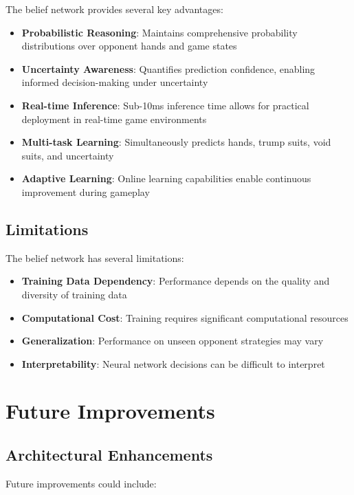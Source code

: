 \documentclass[conference]{IEEEtran}
\begin{document}
The belief network provides several key advantages:

\begin{itemize}
    \item \textbf{Probabilistic Reasoning}: Maintains comprehensive probability distributions over opponent hands and game states
    \item \textbf{Uncertainty Awareness}: Quantifies prediction confidence, enabling informed decision-making under uncertainty
    \item \textbf{Real-time Inference}: Sub-10ms inference time allows for practical deployment in real-time game environments
    \item \textbf{Multi-task Learning}: Simultaneously predicts hands, trump suits, void suits, and uncertainty
    \item \textbf{Adaptive Learning}: Online learning capabilities enable continuous improvement during gameplay
\end{itemize}

\subsection{Limitations}

The belief network has several limitations:

\begin{itemize}
    \item \textbf{Training Data Dependency}: Performance depends on the quality and diversity of training data
    \item \textbf{Computational Cost}: Training requires significant computational resources
    \item \textbf{Generalization}: Performance on unseen opponent strategies may vary
    \item \textbf{Interpretability}: Neural network decisions can be difficult to interpret
\end{itemize}

\section{Future Improvements}

\subsection{Architectural Enhancements}

Future improvements could include:
\end{document}
